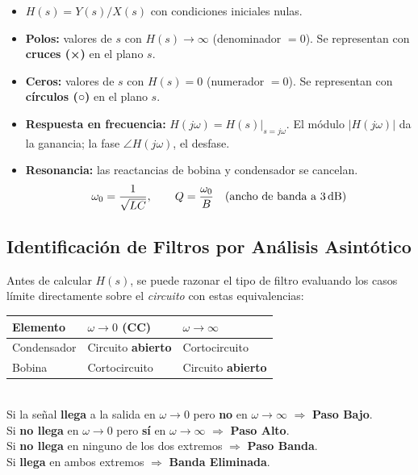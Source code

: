 \documentclass[12pt,a4paper]{article}
\begin{document}
\begin{itemize}[leftmargin=1.5em, itemsep=4pt]
  \item $H(s) = Y(s)/X(s)$ con condiciones iniciales nulas.
  \item \textbf{Polos:} valores de $s$ con $H(s)\to\infty$ (denominador $= 0$).
        Se representan con \textbf{cruces (×)} en el plano $s$.
  \item \textbf{Ceros:} valores de $s$ con $H(s) = 0$ (numerador $= 0$).
        Se representan con \textbf{círculos (○)} en el plano $s$.
  \item \textbf{Respuesta en frecuencia:} $H(j\omega) = H(s)\big|_{s=j\omega}$.
        El módulo $|H(j\omega)|$ da la ganancia; la fase $\angle H(j\omega)$, el desfase.
  \item \textbf{Resonancia:} las reactancias de bobina y condensador se cancelan.
  \[
    \omega_0 = \frac{1}{\sqrt{LC}}, \qquad Q = \frac{\omega_0}{B}
    \quad\text{(ancho de banda a 3\,dB)}
  \]
\end{itemize}

\subsection{Identificación de Filtros por Análisis Asintótico}

Antes de calcular $H(s)$, se puede razonar el tipo de filtro evaluando los casos
límite directamente sobre el \emph{circuito} con estas equivalencias:

\begin{formulabox}
\renewcommand{\arraystretch}{1.5}
\begin{tabular}{lll}
\toprule
\textbf{Elemento} & $\omega \to 0$ \;(CC) & $\omega \to \infty$\\
\midrule
Condensador & Circuito \textbf{abierto} & Cortocircuito\\
Bobina      & Cortocircuito             & Circuito \textbf{abierto}\\
\bottomrule
\end{tabular}\\[8pt]
Si la señal \textbf{llega} a la salida en $\omega\to 0$ pero \textbf{no} en
$\omega\to\infty$ $\Rightarrow$ \textbf{Paso Bajo}.\\
Si \textbf{no llega} en $\omega\to 0$ pero \textbf{sí} en
$\omega\to\infty$ $\Rightarrow$ \textbf{Paso Alto}.\\
Si \textbf{no llega} en ninguno de los dos extremos $\Rightarrow$ \textbf{Paso Banda}.\\
Si \textbf{llega} en ambos extremos $\Rightarrow$ \textbf{Banda Eliminada}.
\end{formulabox}
\end{document}
